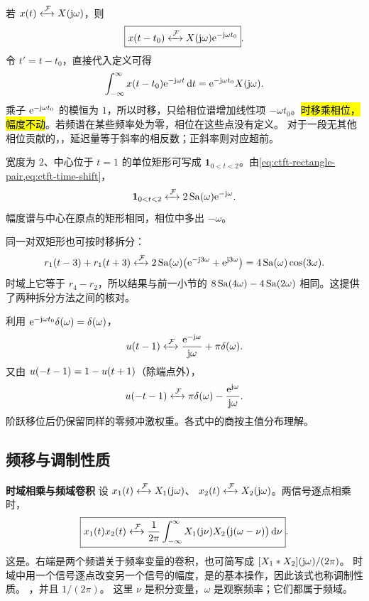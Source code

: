 若 $x(t)\mathrel{\xleftrightarrow{\,\mathcal{F}\,}} X(\mathrm{j}\omega)$，则
\begin{equation}
  \boxed{x(t-t_0)
  \mathrel{\xleftrightarrow{\,\mathcal{F}\,}}
  X(\mathrm{j}\omega)\mathrm{e}^{-\mathrm{j}\omega t_0}}.
  \label{eq:ctft-time-shift}
\end{equation}
令 $t'=t-t_0$，直接代入定义可得
\[
  \int_{-\infty}^{\infty}x(t-t_0)\mathrm{e}^{-\mathrm{j}\omega t}\mathop{}\!\mathrm{d} t
  =\mathrm{e}^{-\mathrm{j}\omega t_0}X(\mathrm{j}\omega).
\]
乘子 $\mathrm{e}^{-\mathrm{j}\omega t_0}$ 的模恒为 $1$，所以时移，只给相位谱增加线性项 $-\omega t_0$。\hl{时移乘相位，幅度不动}。若频谱在某些频率处为零，相位在这些点没有定义。
对于一段无其他相位贡献的，，延迟量等于斜率的相反数；正斜率则对应超前。

\begin{example}[延迟的矩形脉冲]
  宽度为 $2$、中心位于 $t=1$ 的单位矩形可写成 $\mathbf 1_{0<t<2}$。由\cref{eq:ctft-rectangle-pair,eq:ctft-time-shift}，
  \[
    \mathbf 1_{0<t<2}
    \mathrel{\xleftrightarrow{\,\mathcal{F}\,}}
    2\operatorname{Sa}(\omega)\mathrm{e}^{-\mathrm{j}\omega}.
  \]
  幅度谱与中心在原点的矩形相同，相位中多出 $-\omega$。
\end{example}

同一对双矩形也可按时移拆分：
\[
  r_1(t-3)+r_1(t+3)
  \mathrel{\xleftrightarrow{\,\mathcal{F}\,}}
  2\operatorname{Sa}(\omega)\bigl(\mathrm{e}^{-\mathrm{j}3\omega}+\mathrm{e}^{\mathrm{j}3\omega}\bigr)
  =4\operatorname{Sa}(\omega)\cos(3\omega).
\]
时域上它等于 $r_4-r_2$，所以结果与前一小节的
$8\operatorname{Sa}(4\omega)-4\operatorname{Sa}(2\omega)$ 相同。这提供了两种拆分方法之间的核对。

\begin{example}[移位阶跃的零频项]
  \label{eg:ctft-shifted-steps}
  利用 $\mathrm{e}^{-\mathrm{j}\omega t_0}\delta(\omega)=\delta(\omega)$，
  \[
    u(t-1)\mathrel{\xleftrightarrow{\,\mathcal{F}\,}}
      \frac{\mathrm{e}^{-\mathrm{j}\omega}}{\mathrm{j}\omega}+\pi\delta(\omega).
  \]
  又由 $u(-t-1)=1-u(t+1)$（除端点外），
  \[
    u(-t-1)\mathrel{\xleftrightarrow{\,\mathcal{F}\,}}
      \pi\delta(\omega)-\frac{\mathrm{e}^{\mathrm{j}\omega}}{\mathrm{j}\omega}.
  \]
  阶跃移位后仍保留同样的零频冲激权重。各式中的商按主值分布理解。
\end{example}

\subsection{频移与调制性质}
\label{sec:ctft-frequency-shift-modulation}

\noindent\textbf{时域相乘与频域卷积}\quad
设 $x_1(t)\mathrel{\xleftrightarrow{\,\mathcal{F}\,}} X_1(\mathrm{j}\omega)$、
$x_2(t)\mathrel{\xleftrightarrow{\,\mathcal{F}\,}} X_2(\mathrm{j}\omega)$。两信号逐点相乘时，
\begin{equation}
  \boxed{x_1(t)x_2(t)
  \mathrel{\xleftrightarrow{\,\mathcal{F}\,}}
  \frac{1}{2\pi}
  \int_{-\infty}^{\infty}
    X_1(\mathrm{j}\nu)X_2\bigl(\mathrm{j}(\omega-\nu)\bigr)\mathop{}\!\mathrm{d}\nu}.
  \label{eq:ctft-frequency-convolution}
\end{equation}
这是。右端是两个频谱关于频率变量的卷积，也可简写成
$[X_1\mathbin{\ast} X_2](\mathrm{j}\omega)/(2\pi)$。
时域中用一个信号逐点改变另一个信号的幅度，是的基本操作，因此该式也称调制性质。
，并且 $1/(2\pi)$。
这里 $\nu$ 是积分变量，$\omega$ 是观察频率；它们都属于频域。

